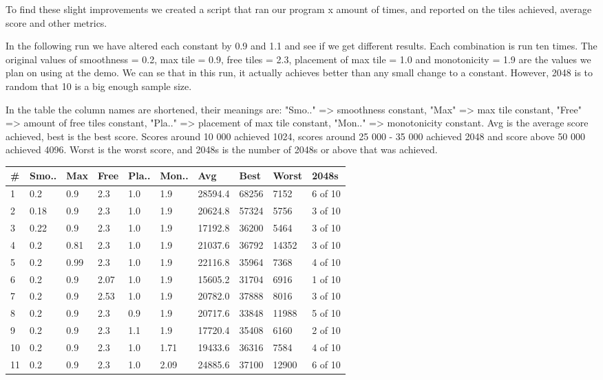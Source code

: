 To find these slight improvements we created a script that ran our program x amount of
times, and reported on the tiles achieved, average score and other metrics.

In the following run we have altered each constant by 0.9 and 1.1 and see if we
get different results. Each combination is run ten times. The original values
of smoothness = 0.2, max tile = 0.9, free tiles = 2.3, placement of max tile = 1.0
and monotonicity = 1.9 are the values we plan on using at the demo. We can se
that in this run, it actually achieves better than any small change to a constant.
However, 2048 is to random that 10 is a big enough sample size.

In the table the column names are shortened, their meanings are: "Smo.." => smoothness
constant, "Max" => max tile constant, "Free" => amount of free tiles constant,
"Pla.." => placement of max tile constant, "Mon.." => monotonicity constant. Avg is the
average score achieved, best is the best score. Scores around 10 000 achieved 1024,
scores around 25 000 - 35 000 achieved 2048 and score above 50 000 achieved 4096.
Worst is the worst score, and 2048s is the number of 2048s or above that was achieved.

\begin{center}
    \begin{tabular}{ | l | l | l | l | l | l | l | l | l | l | }
    \hline
    \# & Smo.. & Max & Free & Pla.. & Mon.. & Avg & Best & Worst & 2048s \\  \hline \hline
    1 & 0.2 & 0.9 & 2.3 &  1.0 & 1.9 & 28594.4 & 68256 & 7152 & 6 of 10 \\ \hline \hline
    2 & 0.18 & 0.9 & 2.3 &  1.0 & 1.9 & 20624.8 & 57324 & 5756 & 3 of 10 \\ \hline
    3 & 0.22 & 0.9 & 2.3 &  1.0 & 1.9 & 17192.8 & 36200 & 5464 & 3 of 10 \\ \hline
    4 & 0.2 & 0.81 & 2.3 &  1.0 & 1.9 & 21037.6 & 36792 & 14352 & 3 of 10 \\ \hline
    5 & 0.2 & 0.99 & 2.3 &  1.0 & 1.9 & 22116.8 & 35964 & 7368 & 4 of 10 \\ \hline
    6 & 0.2 & 0.9 & 2.07 &  1.0 & 1.9 & 15605.2 & 31704 & 6916 & 1 of 10 \\ \hline
    7 & 0.2 & 0.9 & 2.53 &  1.0 & 1.9 & 20782.0 & 37888 & 8016 & 3 of 10 \\ \hline
    8 & 0.2 & 0.9 & 2.3 &  0.9 & 1.9 & 20717.6 & 33848 & 11988 & 5 of 10 \\ \hline
    9 & 0.2 & 0.9 & 2.3 &  1.1 & 1.9 & 17720.4 & 35408 & 6160 & 2 of 10 \\ \hline
    10 & 0.2 & 0.9 & 2.3 &  1.0 & 1.71 & 19433.6 & 36316 & 7584 & 4 of 10 \\ \hline
    11 & 0.2 & 0.9 & 2.3 &  1.0 & 2.09 & 24885.6 & 37100 & 12900 & 6 of 10 \\ \hline
    \end{tabular}
\end{center}

